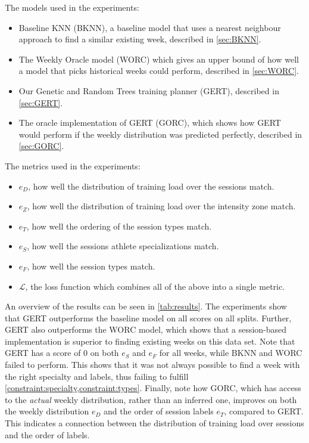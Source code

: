 The models used in the experiments:
\begin{itemize}
    \item Baseline KNN (BKNN), a baseline model that uses a nearest neighbour approach to find a similar existing week, described in \cref{sec:BKNN}.
    \item The Weekly Oracle model (WORC) which gives an upper bound of how well a model that picks historical weeks could perform, described in \cref{sec:WORC}.
    \item Our Genetic and Random Trees training planner (GERT), described in \cref{sec:GERT}.
    \item The oracle implementation of GERT (GORC), which shows how GERT would perform if the weekly distribution was predicted perfectly, described in \cref{sec:GORC}.
\end{itemize}
The metrics used in the experiments:
\begin{itemize}
    \item $e_D$, how well the distribution of training load over the sessions match.
    \item $e_Z$, how well the distribution of training load over the intensity zone match.
    \item $e_T$, how well the ordering of the session types match.
    \item $e_S$, how well the sessions athlete specializations match.
    \item $e_F$, how well the session types match.
    \item $\mathcal{L}$, the loss function which combines all of the above into a single metric.
\end{itemize}

An overview of the results can be seen in \cref{tab:results}.
The experiments show that GERT outperforms the baseline model on all scores on all splits.
Further, GERT also outperforms the WORC model, which shows that a session-based implementation is superior to finding existing weeks on this data set.
Note that GERT has a score of $0$ on both $e_S$ and $e_F$ for all weeks, while BKNN and WORC failed to perform.
This shows that it was not always possible to find a week with the right specialty and labels, thus failing to fulfill \cref{constraint:specialty,constraint:types}.
Finally, note how GORC, which has access to the \textit{actual} weekly distribution, rather than an inferred one, improves on both the weekly distribution $e_D$ and the order of session labels $e_T$, compared to GERT. This indicates a connection between the distribution of training load over sessions and the order of labels.

